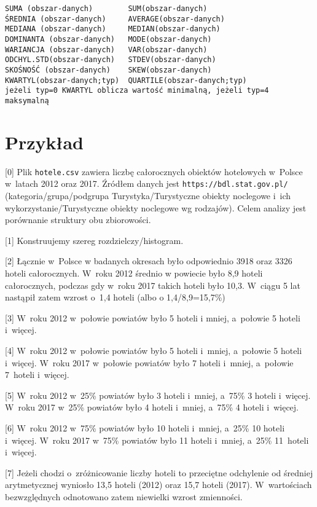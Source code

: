 \documentclass[a4page,11pt]{article}
\begin{document}
\begin{verbatim}
SUMA (obszar-danych)        SUM(obszar-danych)
ŚREDNIA (obszar-danych)     AVERAGE(obszar-danych)
MEDIANA (obszar-danych)     MEDIAN(obszar-danych)
DOMINANTA (obszar-danych)   MODE(obszar-danych)
WARIANCJA (obszar-danych)   VAR(obszar-danych)
ODCHYL.STD(obszar-danych)   STDEV(obszar-danych)
SKOŚNOŚĆ (obszar-danych)    SKEW(obszar-danych)
KWARTYL(obszar-danych;typ)  QUARTILE(obszar-danych;typ)
jeżeli typ=0 KWARTYL oblicza wartość minimalną, jeżeli typ=4 maksymalną
\end{verbatim}

\section{Przykład}

[0] Plik \texttt{hotele.csv} zawiera liczbę całorocznych obiektów
hotelowych w~Polsce w~latach 2012 oraz 2017.  Źródłem danych jest
\texttt{https://bdl.stat.gov.pl/} (kategoria/grupa/podgrupa
Turystyka/Turystyczne obiekty noclegowe i~ich
wykorzystanie/Turystyczne obiekty noclegowe wg rodzajów). Celem
analizy jest porównanie struktury obu zbiorowości.

[1] Konstruujemy szereg rozdzielczy/histogram.

[2] Łącznie w~Polsce w badanych okresach było odpowiednio 3918 oraz
3326 hoteli całorocznych. W~roku 2012 średnio w powiecie było 8,9
hoteli całorocznych, podczas gdy w~roku 2017 takich hoteli było 10,3.
W~ciągu 5 lat nastąpił zatem wzrost o~1,4 hoteli (albo o
1,4/8,9=15,7\%)

[3] W~roku 2012 w~połowie powiatów było 5 hoteli i mniej,
a~połowie 5 hoteli i~więcej.

[4] W~roku 2012 w~połowie powiatów było 5 hoteli i~mniej, a~połowie 5
hoteli i~więcej. W~roku 2017 w~połowie powiatów było 7 hoteli i~mniej,
a~połowie 7~hoteli i~więcej.

[5] W~roku 2012 w~25\% powiatów było 3 hoteli i~mniej, a~75\% 3 hoteli
i~więcej.  W~roku 2017 w~25\% powiatów było 4 hoteli i~mniej, a~75\% 4
hoteli i~więcej.

[6] W~roku 2012 w~75\% powiatów było 10 hoteli i~mniej, a~25\% 10 hoteli
i~więcej.  W~roku 2017 w~75\% powiatów było 11 hoteli i~mniej, a~25\%
11~hoteli i~więcej.

[7] Jeżeli chodzi o~zróżnicowanie liczby hoteli to przeciętne odchylenie
od średniej arytmetycznej
wyniosło 13,5 hoteli (2012) oraz 15,7 hoteli (2017).
W~wartościach bezwzględnych odnotowano zatem niewielki wzrost zmienności.
\end{document}

